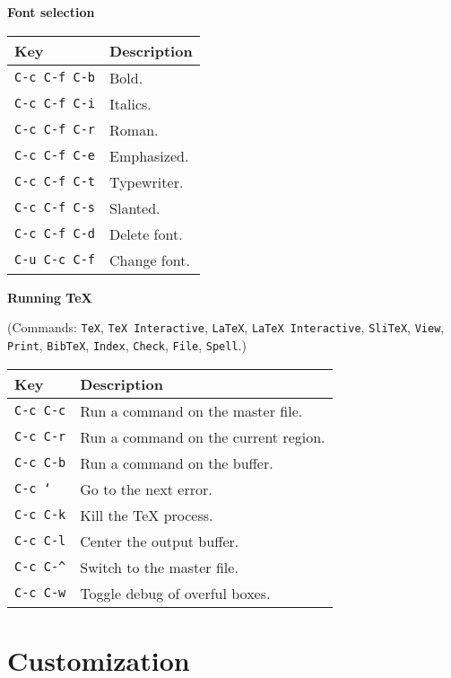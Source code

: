 \documentclass{article}
\begin{document}
\smallskip

\noindent
\textbf{Font selection}

\smallskip

\noindent
\begin{tabular}{p{\firstcol}p{\secondcol}}
\hline
\textbf{Key} & \textbf{Description}\\
\hline
\texttt{C-c C-f C-b}
& Bold.\\
\texttt{C-c C-f C-i}
& Italics.\\
\texttt{C-c C-f C-r}
& Roman.\\
\texttt{C-c C-f C-e}
& Emphasized.\\
\texttt{C-c C-f C-t}
& Typewriter.\\
\texttt{C-c C-f C-s}
& Slanted.\\
\texttt{C-c C-f C-d}
& Delete font.\\
\texttt{C-u C-c C-f}
& Change font.
\end{tabular}

\noindent
\textbf{Running \TeX{}}

\smallskip

\noindent
(Commands: \texttt{TeX}, \texttt{TeX Interactive}, \texttt{LaTeX},
\texttt{LaTeX Interactive}, \texttt{SliTeX}, \texttt{View},
\texttt{Print}, \texttt{BibTeX}, \texttt{Index}, \texttt{Check},
\texttt{File}, \texttt{Spell}.)

\smallskip

\noindent
\begin{tabular}{p{\firstcol}p{\secondcol}}
\hline
\textbf{Key} & \textbf{Description}\\
\hline
\texttt{C-c C-c}
& Run a command on the master file.\\
\texttt{C-c C-r}
& Run a command on the current region.\\
\texttt{C-c C-b}
& Run a command on the buffer.\\
\texttt{C-c `}
& Go to the next error.\\
\texttt{C-c C-k}
& Kill the \TeX{} process.\\
\texttt{C-c C-l}
& Center the output buffer.\\
\texttt{C-c C-\^{}}
& Switch to the master file.\\
\texttt{C-c C-w}
& Toggle debug of overful boxes.\\
\end{tabular}

\section{Customization}
\end{document}
